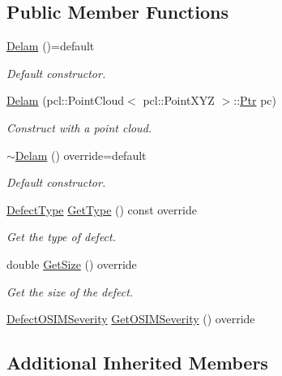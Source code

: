 \subsection*{Public Member Functions}
\begin{DoxyCompactItemize}
\item 
\hyperlink{classbeam__defects_1_1_delam_a1a108358cf5f4d07cbe4ad3b7ac00997}{Delam} ()=default
\begin{DoxyCompactList}\small\item\em Default constructor. \end{DoxyCompactList}\item 
\hyperlink{classbeam__defects_1_1_delam_a985ea836e28343406faa18c173b106c7}{Delam} (pcl\+::\+Point\+Cloud$<$ pcl\+::\+Point\+X\+YZ $>$\+::\hyperlink{classbeam__defects_1_1_defect_a0a7708c6cd92ac482d45ef606d598325}{Ptr} pc)
\begin{DoxyCompactList}\small\item\em Construct with a point cloud. \end{DoxyCompactList}\item 
\hyperlink{classbeam__defects_1_1_delam_aef2a99b590cef7c0b400695ca14533cf}{$\sim$\+Delam} () override=default
\begin{DoxyCompactList}\small\item\em Default constructor. \end{DoxyCompactList}\item 
\hyperlink{group__defects_gae379b271bd5fb7ce92afe1abee917249}{Defect\+Type} \hyperlink{classbeam__defects_1_1_delam_a098488b1a71796df7e9a6d0eb5eaeeea}{Get\+Type} () const override
\begin{DoxyCompactList}\small\item\em Get the type of defect. \end{DoxyCompactList}\item 
double \hyperlink{classbeam__defects_1_1_delam_a9a44051492d76e180e85e31724acc26a}{Get\+Size} () override
\begin{DoxyCompactList}\small\item\em Get the size of the defect. \end{DoxyCompactList}\item 
\hyperlink{group__defects_gaed38c449f8cba57f35d1af04496a0711}{Defect\+O\+S\+I\+M\+Severity} \hyperlink{classbeam__defects_1_1_delam_a185b2cb8f43376dda9a1c87a41e18829}{Get\+O\+S\+I\+M\+Severity} () override
\end{DoxyCompactItemize}
\subsection*{Additional Inherited Members}


